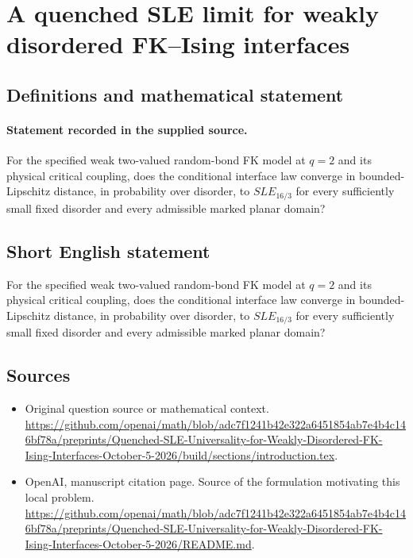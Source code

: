 \documentclass[11pt]{article}
\begin{document}
\section*{A quenched SLE limit for weakly disordered FK–Ising interfaces}\label{statement}
\subsection{Definitions and mathematical statement}
\paragraph{Statement recorded in the supplied source.}
For the specified weak two-valued random-bond FK model at $q=2$ and its physical critical coupling, does the conditional interface law converge in bounded-Lipschitz distance, in probability over disorder, to $SLE_{16/3}$ for every sufficiently small fixed disorder and every admissible marked planar domain?
\subsection{Short English statement}
For the specified weak two-valued random-bond FK model at $q=2$ and its physical critical coupling, does the conditional interface law converge in bounded-Lipschitz distance, in probability over disorder, to $SLE_{16/3}$ for every sufficiently small fixed disorder and every admissible marked planar domain?
\subsection{Sources}
\begin{itemize}
\item[S1] Original question source or mathematical context.
\url{https://github.com/openai/math/blob/adc7f1241b42e322a6451854ab7e4b4c146bf78a/preprints/Quenched-SLE-Universality-for-Weakly-Disordered-FK-Ising-Interfaces-October-5-2026/build/sections/introduction.tex}.
\item[S2] OpenAI, manuscript citation page. Source of the formulation motivating this local problem.
\url{https://github.com/openai/math/blob/adc7f1241b42e322a6451854ab7e4b4c146bf78a/preprints/Quenched-SLE-Universality-for-Weakly-Disordered-FK-Ising-Interfaces-October-5-2026/README.md}.
\end{itemize}
\end{document}
